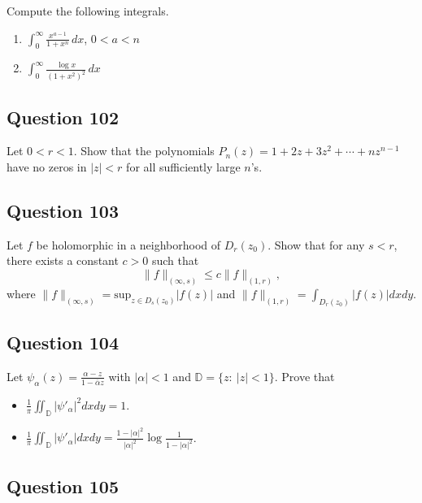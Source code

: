 \documentclass[12pt]{article}
\begin{document}
Compute the following integrals.

\begin{enumerate}
\def\labelenumi{(\roman{enumi})}
\item
  \(\displaystyle \int_0^\infty \frac{x^{a-1}}{1 + x^n} \, dx\),
  \(0< a < n\)
\item
  \(\displaystyle \int_0^\infty \frac{\log x}{(1 + x^2)^2}\, dx\)
\end{enumerate}

\hypertarget{question-102-1}{%
\subsection{Question 102}\label{question-102-1}}

Let \(0<r<1\). Show that the polynomials
\(P_n(z) = 1 + 2z + 3 z^2 + \cdots + n z^{n-1}\) have no zeros in
\(|z|<r\) for all sufficiently large \(n\)'s.

\hypertarget{question-103-1}{%
\subsection{Question 103}\label{question-103-1}}

Let \(f\) be holomorphic in a neighborhood of \(D_r(z_0)\). Show that
for any \(s<r\), there exists a constant \(c>0\) such that
\[\|f\|_{(\infty, s)} \leq c \|f\|_{(1, r)},\] where
\(\displaystyle \|f\|_{(\infty, s)} = \text{sup}_{z \in D_s(z_0)}|f(z)|\)
and \(\displaystyle \|f\|_{(1, r)} = \int_{D_r(z_0)} |f(z)|dx dy\).

\hypertarget{question-104-1}{%
\subsection{Question 104}\label{question-104-1}}

Let \(\displaystyle{\psi_{\alpha}(z)=\frac{\alpha-z}{1-\bar{\alpha}z}}\)
with \(|\alpha|<1\) and \({\mathbb D}=\{z:\ |z|<1\}\). Prove that

\begin{itemize}
\item
  \(\displaystyle{\frac{1}{\pi}\iint_{{\mathbb D}} |\psi'_{\alpha}|^2 dx dy =1}\).
\item
  \(\displaystyle{\frac{1}{\pi}\iint_{{\mathbb D}} |\psi'_{\alpha}| dx dy =\frac{1-|\alpha|^2}{|\alpha|^2} \log \frac{1}{1-|\alpha|^2}}\).
\end{itemize}

\hypertarget{question-105-1}{%
\subsection{Question 105}\label{question-105-1}}
\end{document}
